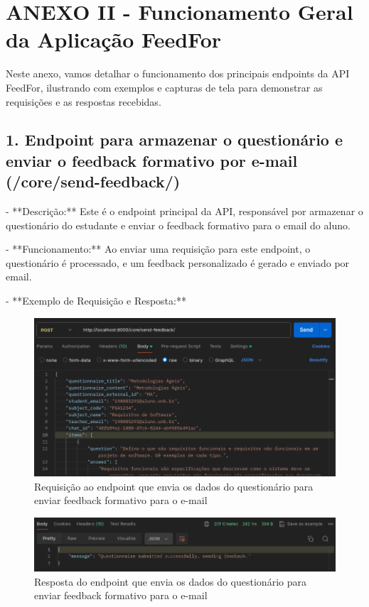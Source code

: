 \chapter*{ANEXO II - Funcionamento Geral da Aplicação FeedFor}
\label{anexoIIFGAF}

Neste anexo, vamos detalhar o funcionamento dos principais endpoints da API FeedFor, ilustrando com exemplos e capturas de tela para demonstrar as requisições e as respostas recebidas.

\section*{1. Endpoint para armazenar o questionário e enviar o feedback formativo por e-mail (/core/send-feedback/)}

- **Descrição:** Este é o endpoint principal da API, responsável por armazenar o questionário do estudante e enviar o feedback formativo para o email do aluno.

- **Funcionamento:** Ao enviar uma requisição para este endpoint, o questionário é processado, e um feedback personalizado é gerado e enviado por email.

- **Exemplo de Requisição e Resposta:**

\begin{figure}[H]
    \centering
    \includegraphics[width=1\textwidth]{figuras/send_report.png}
    \caption{Requisição ao endpoint que envia os dados do questionário para enviar feedback formativo para o e-mail}
    \label{fig:report_questions}
\end{figure}

\begin{figure}[H]
    \centering
    \includegraphics[width=1\textwidth]{figuras/send_report_result.png}
    \caption{Resposta do endpoint que envia os dados do questionário para enviar feedback formativo para o e-mail}
    \label{fig:report_questions}
\end{figure}

